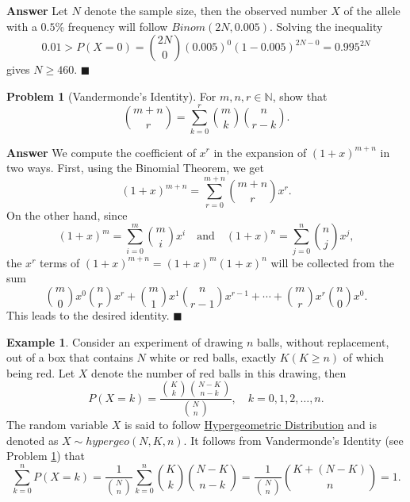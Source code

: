 \documentclass[12pt,letterpaper]{book}
\numberwithin{equation}{section}
\theoremstyle{definition}
\newtheorem{problem}[thm]{\textbf{Problem}}
\newtheorem{example}[thm]{\textbf{Example}}
\newenvironment{answer}{\noindent\textbf{Answer}}{\hfill$\blacksquare$\vspace{0.1in}}
\begin{document}
\begin{answer}
Let $N$ denote the sample size, then the observed number $X$ of the allele with a $0.5$\% frequency will follow $Binom(2N,0.005)$. Solving the inequality 
$$0.01>P(X=0)={2N \choose 0}(0.005)^0(1-0.005)^{2N-0}=0.995^{2N}$$
gives $N\geq 460$.
\end{answer}

\begin{problem}[Vandermonde's Identity]\label{VandId} For $m,n,r\in \mathbb{N}$, show that
$${m+n \choose r}=\sum_{k=0}^r {m \choose k}{n \choose r-k}.$$
\end{problem}

\begin{answer}
We compute the coefficient of $x^r$ in the expansion of $(1+x)^{m+n}$ in two ways. First, using the Binomial Theorem, we get
$$(1+x)^{m+n}=\sum_{r=0}^{m+n}{m+n\choose r}x^r.$$ On the other hand, since
$$(1+x)^m=\sum_{i=0}^{m}{m\choose i}x^i\quad\text{and}\quad (1+x)^n=\sum_{j=0}^{n}{n\choose j}x^j,$$
the $x^r$ terms of $(1+x)^{m+n}=(1+x)^{m}(1+x)^{n}$ will be collected from the sum
$${m\choose 0}x^{0}{n\choose r}x^r+{m\choose 1}x^{1}{n\choose r-1}x^{r-1}+\cdots+{m\choose r}x^{r}{n\choose 0}x^0.$$This leads to the desired identity.
\end{answer}

\begin{example}\label{hypergeo}
Consider an experiment of drawing $n$ balls, without replacement, out of a box that contains $N$ white or red balls, exactly $K(K\geq n)$ of which being red.  Let $X$ denote the number of red balls in this drawing, then
$$P(X=k)=\frac{{K \choose k} {N-K \choose n-k}}{{N \choose n}}, \quad k=0,1,2,\ldots,n.$$
The random variable $X$ is said to follow \underline{Hypergeometric Distribution} and is denoted as $X\sim hypergeo(N,K,n)$. It follows from Vandermonde's Identity (see Problem \ref{VandId}) that
$$\sum_{k=0}^nP(X=k)=\frac{1}{{N \choose n}}\sum_{k=0}^n {K \choose k} {N-K \choose n-k}=\frac{1}{{N \choose n}}{K+(N-K) \choose n}=1.$$
\end{example}
\end{document}
